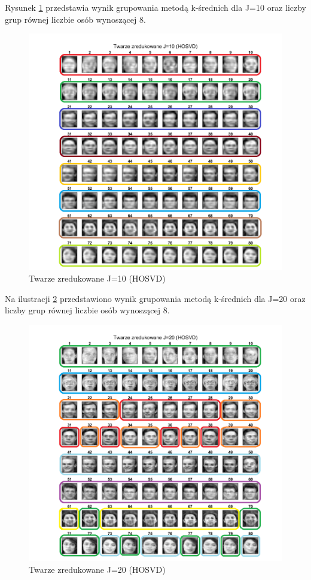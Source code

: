 \documentclass[11pt, a4paper]{article}
\begin{document}
\newpage
Rysunek \ref{fig:rezultat_HOSVD_j10} przedstawia wynik grupowania metodą k-średnich dla J=10 oraz liczby grup równej liczbie osób wynoszącej 8.

\begin{figure}[H]
	\centering
	\includegraphics[width=1\textwidth]{./assets/rezultat_HOSVD_j10.png}
	\caption{Twarze zredukowane J=10 (HOSVD)}
	\label{fig:rezultat_HOSVD_j10}
\end{figure}

\newpage
Na ilustracji \ref{fig:rezultat_HOSVD_j20} przedstawiono wynik grupowania metodą k-średnich dla J=20 oraz liczby grup równej liczbie osób wynoszącej 8.

\begin{figure}[H]
	\centering
	\includegraphics[width=1\textwidth]{./assets/rezultat_HOSVD_j20.png}
	\caption{Twarze zredukowane J=20 (HOSVD)}
	\label{fig:rezultat_HOSVD_j20}
\end{figure}
\end{document}

